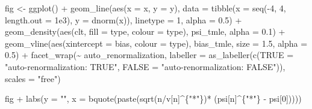 \documentclass[
  11pt,
  openright,twoside]{book}
\newenvironment{Shaded}{\begin{snugshade}}{\end{snugshade}}
\newcommand{\AttributeTok}[1]{\textcolor[rgb]{0.77,0.63,0.00}{#1}}
\newcommand{\DecValTok}[1]{\textcolor[rgb]{0.00,0.00,0.81}{#1}}
\newcommand{\FloatTok}[1]{\textcolor[rgb]{0.00,0.00,0.81}{#1}}
\newcommand{\FunctionTok}[1]{\textcolor[rgb]{0.00,0.00,0.00}{#1}}
\newcommand{\NormalTok}[1]{#1}
\newcommand{\OtherTok}[1]{\textcolor[rgb]{0.56,0.35,0.01}{#1}}
\newcommand{\SpecialCharTok}[1]{\textcolor[rgb]{0.00,0.00,0.00}{#1}}
\newcommand{\StringTok}[1]{\textcolor[rgb]{0.31,0.60,0.02}{#1}}
\theoremstyle{definition}
\theoremstyle{definition}
\theoremstyle{definition}
\theoremstyle{definition}
\theoremstyle{remark}
\begin{document}
\begin{Shaded}
\begin{Highlighting}[]
\NormalTok{fig }\OtherTok{\textless{}{-}} \FunctionTok{ggplot}\NormalTok{() }\SpecialCharTok{+}
  \FunctionTok{geom\_line}\NormalTok{(}\FunctionTok{aes}\NormalTok{(}\AttributeTok{x =}\NormalTok{ x, }\AttributeTok{y =}\NormalTok{ y), }
            \AttributeTok{data =} \FunctionTok{tibble}\NormalTok{(}\AttributeTok{x =} \FunctionTok{seq}\NormalTok{(}\SpecialCharTok{{-}}\DecValTok{4}\NormalTok{, }\DecValTok{4}\NormalTok{, }\AttributeTok{length.out =} \FloatTok{1e3}\NormalTok{),}
                          \AttributeTok{y =} \FunctionTok{dnorm}\NormalTok{(x)),}
            \AttributeTok{linetype =} \DecValTok{1}\NormalTok{, }\AttributeTok{alpha =} \FloatTok{0.5}\NormalTok{) }\SpecialCharTok{+}
  \FunctionTok{geom\_density}\NormalTok{(}\FunctionTok{aes}\NormalTok{(clt, }\AttributeTok{fill =}\NormalTok{ type, }\AttributeTok{colour =}\NormalTok{ type),}
\NormalTok{               psi\_tmle, }\AttributeTok{alpha =} \FloatTok{0.1}\NormalTok{) }\SpecialCharTok{+}
  \FunctionTok{geom\_vline}\NormalTok{(}\FunctionTok{aes}\NormalTok{(}\AttributeTok{xintercept =}\NormalTok{ bias, }\AttributeTok{colour =}\NormalTok{ type),}
\NormalTok{             bias\_tmle, }\AttributeTok{size =} \FloatTok{1.5}\NormalTok{, }\AttributeTok{alpha =} \FloatTok{0.5}\NormalTok{) }\SpecialCharTok{+}
  \FunctionTok{facet\_wrap}\NormalTok{(}\SpecialCharTok{\textasciitilde{}}\NormalTok{ auto\_renormalization,}
             \AttributeTok{labeller =}
               \FunctionTok{as\_labeller}\NormalTok{(}\FunctionTok{c}\NormalTok{(}\StringTok{\textasciigrave{}}\AttributeTok{TRUE}\StringTok{\textasciigrave{}} \OtherTok{=} \StringTok{"auto{-}renormalization: TRUE"}\NormalTok{,}
                             \StringTok{\textasciigrave{}}\AttributeTok{FALSE}\StringTok{\textasciigrave{}} \OtherTok{=} \StringTok{"auto{-}renormalization: FALSE"}\NormalTok{)),}
             \AttributeTok{scales =} \StringTok{"free"}\NormalTok{)}
  
\NormalTok{fig }\SpecialCharTok{+}
  \FunctionTok{labs}\NormalTok{(}\AttributeTok{y =} \StringTok{""}\NormalTok{,}
       \AttributeTok{x =} \FunctionTok{bquote}\NormalTok{(}\FunctionTok{paste}\NormalTok{(}\FunctionTok{sqrt}\NormalTok{(n}\SpecialCharTok{/}\NormalTok{v[n]}\SpecialCharTok{\^{}}\NormalTok{\{}\StringTok{"*"}\NormalTok{\})}\SpecialCharTok{*}
\NormalTok{                        (psi[n]}\SpecialCharTok{\^{}}\NormalTok{\{}\StringTok{"*"}\NormalTok{\} }\SpecialCharTok{{-}}\NormalTok{ psi[}\DecValTok{0}\NormalTok{]))))}
\end{Highlighting}
\end{Shaded}
\end{document}
